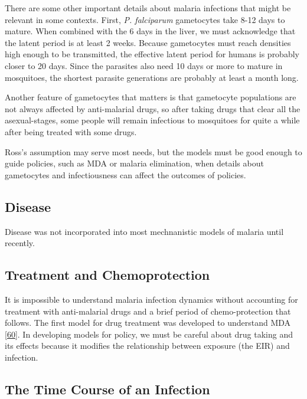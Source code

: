 \documentclass[
]{book}
\begin{document}
There are some other important details about malaria infections that might be relevant in some contexts. First, \emph{P. falciparum} gametocytes take 8-12 days to mature. When combined with the 6 days in the liver, we must acknowledge that the latent period is at least 2 weeks. Because gametocytes must reach densities high enough to be transmitted, the effective latent period for humans is probably closer to 20 days. Since the parasites also need 10 days or more to mature in mosquitoes, the shortest parasite generations are probably at least a month long.

Another feature of gametocytes that matters is that gametocyte populations are not always affected by anti-malarial drugs, so after taking drugs that clear all the asexual-stages, some people will remain infectious to mosquitoes for quite a while after being treated with some drugs.

Ross's assumption may serve most needs, but the models must be good enough to guide policies, such as MDA or malaria elimination, when details about gametocytes and infectiousness can affect the outcomes of policies.

\hypertarget{disease}{%
\subsection{Disease}\label{disease}}

Disease was not incorporated into most mechnanistic models of malaria until recently.

\hypertarget{treatment-and-chemoprotection}{%
\subsection{Treatment and Chemoprotection}\label{treatment-and-chemoprotection}}

It is impossible to understand malaria infection dynamics without accounting for treatment with anti-malarial drugs and a brief period of chemo-protection that follows. The first model for drug treatment was developed to understand MDA {[}\protect\hyperlink{ref-DietzK1975ModelsParasitic}{60}{]}. In developing models for policy, we must be careful about drug taking and its effects because it modifies the relationship between exposure (the EIR) and infection.

\hypertarget{the-time-course-of-an-infection}{%
\subsection{The Time Course of an Infection}\label{the-time-course-of-an-infection}}
\end{document}
